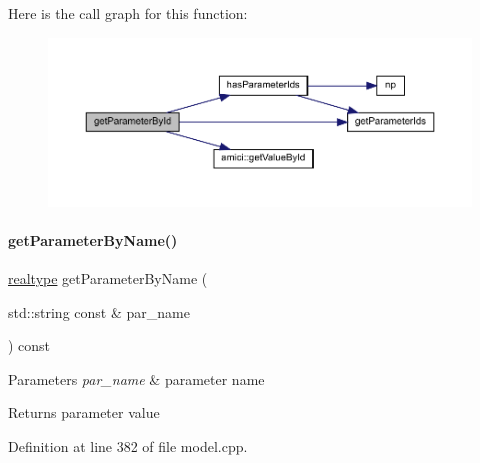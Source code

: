 Here is the call graph for this function\+:
\nopagebreak
\begin{figure}[H]
\begin{center}
\leavevmode
\includegraphics[width=350pt]{classamici_1_1_model_a4436bd89ae2cb032cbf13db478d99e15_cgraph}
\end{center}
\end{figure}
\mbox{\label{classamici_1_1_model_a19b349ca9793d45fda7ef8ea7422747a}} 
\paragraph{\texorpdfstring{get\+Parameter\+By\+Name()}{getParameterByName()}}
{\footnotesize\ttfamily \mbox{\hyperlink{namespaceamici_a1bdce28051d6a53868f7ccbf5f2c14a3}{realtype}} get\+Parameter\+By\+Name (\begin{DoxyParamCaption}\item[{std\+::string const \&}]{par\+\_\+name }\end{DoxyParamCaption}) const}


\begin{DoxyParams}{Parameters}
{\em par\+\_\+name} & parameter name \\
\hline
\end{DoxyParams}
\begin{DoxyReturn}{Returns}
parameter value 
\end{DoxyReturn}


Definition at line 382 of file model.\+cpp.

